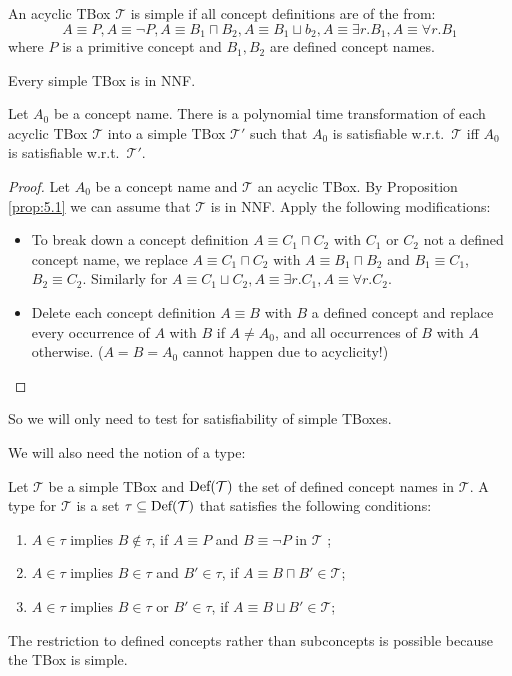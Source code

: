 \begin{definition*}
	An acyclic TBox $\mathcal{T}$ is simple if all concept definitions are of the from:
	\[
	A \equiv P, A \equiv \neg P, A \equiv B_1 \sqcap B_2, A \equiv B_1 \sqcup b_2, A \equiv \exists r.B_1, A \equiv \forall r.B_1
	\]
	where $P$ is a primitive concept and $B_1, B_2$ are defined concept names.
\end{definition*}
\begin{note}
	Every simple TBox is in NNF.
\end{note}

\begin{lemma}\label{lem:5.2}
	Let $A_0$ be a concept name.
	There is a polynomial time transformation of each acyclic TBox $\mathcal{T}$
	into a simple TBox $\mathcal{T}'$ such that $A_0$ is satisfiable w.r.t.\ $\mathcal{T}$ 
	iff $A_0$ is satisfiable w.r.t.\ $\mathcal{T}'$.
\end{lemma}
\begin{proof}
	Let $A_0$ be a concept name and $\mathcal{T}$ an acyclic TBox.
	By Proposition \ref{prop:5.1} we can assume that $\mathcal{T}$ is in NNF.
	Apply the following modifications:
	\begin{itemize}
		\item To break down a concept definition $A \equiv C_1 \sqcap C_2$
			with $C_1$ or $C_2$ not a defined concept name,
			we replace $A \equiv C_1 \sqcap C_2$ with $A \equiv B_1 \sqcap B_2$ 
			and $B_1 \equiv C_1$, $B_2 \equiv C_2$.
			Similarly for $A \equiv C_1 \sqcup C_2, A \equiv \exists r.C_1, A \equiv \forall r.C_2$.
		\item Delete each concept definition $A \equiv B$ with $B$ a defined concept
			and replace every occurrence of $A $ with $B$ if $A \neq A_0$, 
			and all occurrences of $B$ with $A$ otherwise.
			($A = B = A_0$ cannot happen due to acyclicity!)
			\qedhere
	\end{itemize}
\end{proof}
So we will only need to test for satisfiability of simple TBoxes.

We will also need the notion of a type:
\begin{definition}[Type]
	Let $\mathcal{T}$ be a simple TBox and $\operatorname{\text{Def}}(\mathcal{T})$ the set of defined concept names in $\mathcal{T}$.
	A type for $\mathcal{T}$ is a set $\tau \subseteq \operatorname{\text{Def}}(\mathcal{T})$
	that satisfies the following conditions:
	\begin{enumerate}
		\item $A \in \tau$ implies $B \notin \tau$, if $A \equiv P$ and $B \equiv \neg P$ in $\mathcal{T}$ ;
		\item $A \in \tau$ implies $B \in \tau$ and $B' \in \tau$, if $A \equiv B \sqcap B' \in \mathcal{T}$;
		\item $A \in \tau$ implies $B \in \tau$ or $B' \in \tau$, if $A \equiv B \sqcup B' \in \mathcal{T}$;
	\end{enumerate}
\end{definition}
\begin{note}
	The restriction to defined concepts rather than subconcepts is possible because the TBox is simple.
\end{note}


